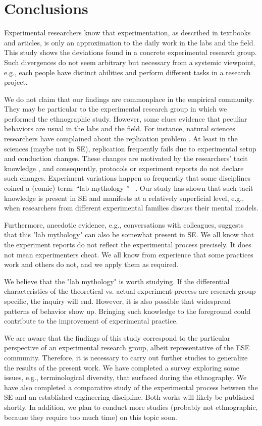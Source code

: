 \section{Conclusions}\label{sec-conclusions}
Experimental researchers know that experimentation, as described in textbooks and articles, is only an approximation to the daily work in the labs and the field. This study shows the deviations found in a concrete experimental research group. Such divergences do not seem arbitrary but necessary from a systemic viewpoint, e.g., each people have distinct abilities and perform different tasks in a research project.

We do not claim that our findings are commonplace in the empirical community. They may be particular to the experimental research group in which we performed the ethnographic study. However, some clues evidence that peculiar behaviors are usual in the labs and the field. For instance, natural sciences researchers have complained about the replication problem \cite{hines2014sorting}. At least in the sciences (maybe not in SE), replication frequently fails due to experimental setup and conduction changes. These changes are motivated by the researchers' tacit knowledge \cite{Polanyi-1996-tacit-k} \cite{Shull-2002-replicating-SE-experiments-tacit-k}, and consequently, protocols or experiment reports do not declare such changes. Experiment variations happen so frequently that some disciplines coined a (comic) term: \textquotedblleft lab mythology \textquotedblright~\cite{ruben2011experimental} \cite{loukides2015beyond}. Our study has shown that such tacit knowledge is present in SE and manifests at a relatively superficial level, e.g., when researchers from different experimental families discuss their mental models.

Furthermore, anecdotic evidence, e.g., conversations with colleagues, suggests that this "lab mythology" can also be somewhat present in SE. We all know that the experiment reports do not reflect the experimental process precisely. It does not mean experimenters cheat. We all know from experience that some practices work and others do not, and we apply them as required.

We believe that the "lab mythology" is worth studying. If the differential characteristics of the theoretical vs. actual experiment process are research-group specific, the inquiry will end. However, it is also possible that widespread patterns of behavior show up. Bringing such knowledge to the foreground could contribute to the improvement of experimental practice.

We are aware that the findings of this study correspond to the particular perspective of an experimental research group, albeit representative of the ESE community. Therefore, it is necessary to carry out further studies to generalize the results of the present work. We have completed a survey exploring some issues, e.g., terminological diversity, that surfaced during the ethnography. We have also completed a comparative study of the experimental process between the SE and an established engineering discipline. Both works will likely be published shortly. In addition, we plan to conduct more studies (probably not ethnographic, because they require too much time) on this topic soon.